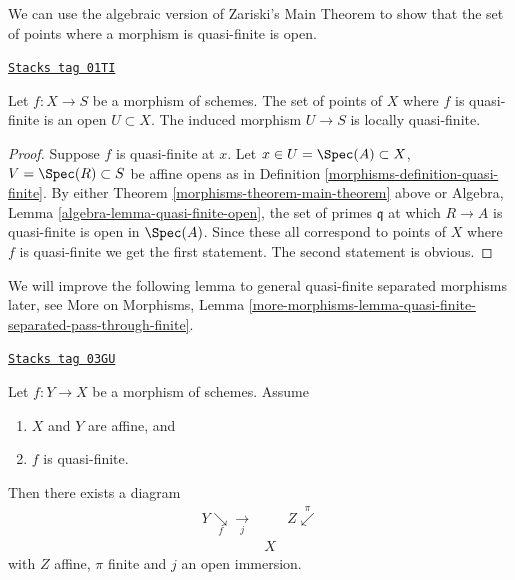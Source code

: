 We can use the algebraic version of Zariski's Main Theorem to show that
the set of points where a morphism is quasi-finite is open.

\begin{lemma}
\label{morphisms-lemma-quasi-finite-points-open}
\href{https://stacks.math.columbia.edu/tag/01TI}{\texttt{Stacks tag 01TI}}


Let $f : X \to S$ be a morphism of schemes.
The set of points of $X$ where $f$ is quasi-finite is an open
$U \subset X$. The induced morphism $U \to S$ is locally quasi-finite.
\end{lemma}

\begin{proof}

Suppose $f$ is quasi-finite at $x$.
Let $x \in U = \Spec(A) \subset X$, $V = \Spec(R) \subset S$
be affine opens as in Definition \ref{morphisms-definition-quasi-finite}.
By either Theorem \ref{morphisms-theorem-main-theorem} above or
Algebra, Lemma \ref{algebra-lemma-quasi-finite-open},
the set of primes $\mathfrak q$ at which $R \to A$ is quasi-finite
is open in $\Spec(A)$. Since these all correspond to points
of $X$ where $f$ is quasi-finite we get the first statement.
The second statement is obvious.
\end{proof}

We will improve the following lemma to general quasi-finite separated
morphisms later, see
More on Morphisms, Lemma
\ref{more-morphisms-lemma-quasi-finite-separated-pass-through-finite}.

\begin{lemma}
\label{morphisms-lemma-quasi-finite-affine}
\href{https://stacks.math.columbia.edu/tag/03GU}{\texttt{Stacks tag 03GU}}

Let $f : Y \to X$ be a morphism of schemes.
Assume
\begin{enumerate}
\item $X$ and $Y$ are affine, and
\item $f$ is quasi-finite.
\end{enumerate}
Then there exists a diagram
$$
\begin{array}{ccc}Y \underset{f}{\searrow}\underset{j}{\longrightarrow} &  & Z \overset{\pi}{\swarrow} \\  & X & \end{array}
$$
with $Z$ affine, $\pi$ finite and $j$ an open immersion.
\end{lemma}

